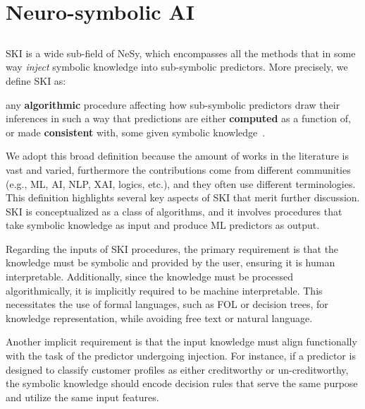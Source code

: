 
\chapter{Neuro-symbolic AI}
\label{ch:nesy-ai}
\minitoc

\section[Symbolic knowledge injection]{}\label{sec:ski}
%
\Gls{SKI} is a wide sub-field of \gls{NeSy}, which encompasses all the methods that in some way \emph{inject} symbolic knowledge into sub-symbolic predictors.
%
More precisely, we define \gls{SKI} as:
%
\begin{definition}
    \label{def:ski}
    any \textbf{algorithmic} procedure affecting how sub-symbolic predictors draw their inferences in such a way that predictions are either \textbf{computed} as a function of, or made \textbf{consistent} with, some given symbolic knowledge~\cite{DBLP:journals/csur/CiattoSAMO24}.
\end{definition}
%
We adopt this broad definition because the amount of works in the literature is vast and varied, furthermore the contributions come from different communities (e.g., \gls{ML}, \gls{AI}, \gls{NLP}, \gls{XAI}, logics, etc.), and they often use different terminologies.
%
This definition highlights several key aspects of \gls{SKI} that merit further discussion.
%
\gls{SKI} is conceptualized as a class of algorithms, and it involves procedures that take symbolic knowledge as input and produce \gls{ML} predictors as output.

Regarding the inputs of \gls{SKI} procedures, the primary requirement is that the knowledge must be symbolic and provided by the user, ensuring it is human interpretable.
%
Additionally, since the knowledge must be processed algorithmically, it is implicitly required to be machine interpretable.
%
This necessitates the use of formal languages, such as \gls{FOL} or decision trees, for knowledge representation, while avoiding free text or natural language.

Another implicit requirement is that the input knowledge must align functionally with the task of the predictor undergoing injection.
%
For instance, if a predictor is designed to classify customer profiles as either creditworthy or un-creditworthy, the symbolic knowledge should encode decision rules that serve the same purpose and utilize the same input features.

